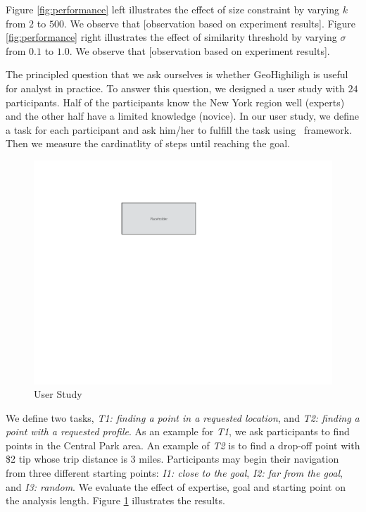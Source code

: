 Figure \ref{fig:performance} left illustrates the effect of size constraint by varying $k$ from $2$ to $500$. We observe that [observation based on experiment results]. Figure \ref{fig:performance} right illustrates the effect of similarity threshold by varying $\sigma$ from $0.1$ to $1.0$. We observe that [observation based on experiment results].

\vspace{5pt}
The principled question that we ask ourselves is whether {\sc GeoHighiligh} is useful for analyst in practice. To answer this question, we designed a user study with $24$ participants. Half of the participants know the New York region well (experts) and the other half have a limited knowledge (novice). In our user study, we define a task for each participant and ask him/her to fulfill the task using \framework\ framework. Then we measure the cardinatlity of steps until reaching the goal.

\begin{figure}
  \centering
  \includegraphics[width=\columnwidth]{figs/placeholder}
\caption{User Study}
\label{fig:userstudy}
\end{figure}

We define two tasks, {\em T1: finding a point in a requested location}, and {\em T2: finding a point with a requested profile}. As an example for {\em T1}, we ask participants to find points in the Central Park area. An example of {\em T2} is to find a drop-off point with \$2 tip whose trip distance is 3 miles. Participants may begin their navigation from three different starting points: {\em I1: close to the goal}, {\em I2: far from the goal}, and {\em I3: random}. We evaluate the effect of expertise, goal and starting point on the analysis length. Figure \ref{fig:userstudy} illustrates the results.

